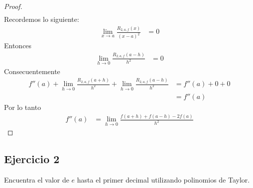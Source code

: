\documentclass[a4paper]{article}
\begin{document}
\begin{proof}
\begin{align*}
    \end{align*}
    Recordemos lo siguiente:
    \begin{align*}
        \lim_{x \to a} \frac{R_{2, a, f}(x)}{(x - a)^2} &=  0
    \end{align*}
    Entonces 
    \begin{align*}
        \lim_{h \to 0} \frac{R_{2, a, f}(a - h)}{h^2} &= 0
    \end{align*}
    Consecuentemente
    \begin{align*}
        f''(a) + \lim_{h \to 0} \frac{R_{2, a, f}(a + h)}{h^2} + \lim_{h \to 0} \frac{R_{2, a, f}(a - h)}{h^2} &= f''(a) + 0 + 0 \\
        &= f''(a)
    \end{align*}
    Por lo tanto 
    \begin{align*}
        f''(a) &= \lim_{h \to 0} \frac{f(a + h) + f(a - h) -2f(a)}{h^2}
    \end{align*}
\end{proof}
\subsection{Ejercicio 2}
\noindent
Encuentra el valor de \(e\) hasta el primer decimal utilizando polinomios de Taylor.
\end{document}
